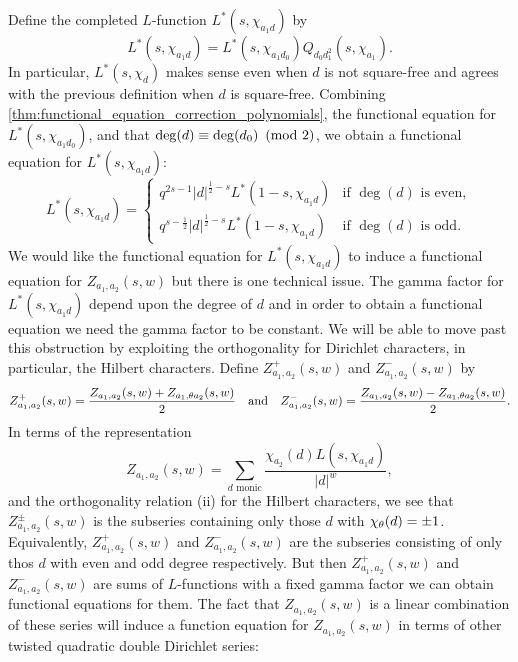 \documentclass[12pt,reqno,oneside]{amsart}
\begin{document}
    Define the completed $L$-function $L^{\ast}(s,\chi_{a_{1}d})$ by
    \[
        L^{\ast}(s,\chi_{a_{1}d}) = L^{\ast}(s,\chi_{a_{1}d_{0}})Q_{d_{0}d_{1}^{2}}(s,\chi_{a_{1}}).
    \]
    In particular, $L^{\ast}(s,\chi_{d})$ makes sense even when $d$ is not square-free and agrees with the previous definition when $d$ is square-free.
    Combining \cref{thm:functional_equation_correction_polynomials}, the functional equation for $L^{\ast}(s,\chi_{a_{1}d_{0}})$, and that $\deg(d) \equiv \deg(d_{0}) \ \left(\text{mod }2\right)$, we obtain a functional equation for $L^{\ast}(s,\chi_{a_{1}d})$:
    \[
        L^{\ast}(s,\chi_{a_{1}d}) = \begin{cases} q^{2s-1}|d|^{\frac{1}{2}-s}L^{\ast}(1-s,\chi_{a_{1}d}) & \text{if $\deg(d)$ is even}, \\ q^{s-\frac{1}{2}}|d|^{\frac{1}{2}-s}L^{\ast}(1-s,\chi_{a_{1}d}) & \text{if $\deg(d)$ is odd}. \end{cases}
    \]
    We would like the functional equation for $L^{\ast}(s,\chi_{a_{1}d})$ to induce a functional equation for $Z_{a_{1},a_{2}}(s,w)$ but there is one technical issue. The gamma factor for $L^{\ast}(s,\chi_{a_{1}d})$ depend upon the degree of $d$ and in order to obtain a functional equation we need the gamma factor to be constant. We will be able to move past this obstruction by exploiting the orthogonality for Dirichlet characters, in particular, the Hilbert characters. Define $Z_{a_{1},a_{2}}^{+}(s,w)$ and $Z_{a_{1},a_{2}}^{-}(s,w)$ by
    \[
        Z_{a_{1},a_{2}}^{+}(s,w) = \frac{Z_{a_{1},a_{2}}(s,w)+Z_{a_{1},\theta a_{2}}(s,w)}{2} \quad \text{and} \quad Z_{a_{1},a_{2}}^{-}(s,w) = \frac{Z_{a_{1},a_{2}}(s,w)-{Z_{a_{1},\theta a_{2}}(s,w)}}{2}.
    \]
    In terms of the representation
    \[
        Z_{a_{1},a_{2}}(s,w) = \sum_{\text{$d$ monic}}\frac{\chi_{a_{2}}(d)L(s,\chi_{a_{1}d})}{|d|^{w}},
    \]
    and the orthogonality relation (ii) for the Hilbert characters, we see that $Z_{a_{1},a_{2}}^{\pm}(s,w)$ is the subseries containing only those $d$ with $\chi_{\theta}(d) = \pm 1$. Equivalently, $Z_{a_{1},a_{2}}^{+}(s,w)$ and $Z_{a_{1},a_{2}}^{-}(s,w)$ are the subseries consisting of only thos $d$ with even and odd degree respectively. But then $Z_{a_{1},a_{2}}^{+}(s,w)$ and $Z_{a_{1},a_{2}}^{-}(s,w)$ are sums of $L$-functions with a fixed gamma factor we can obtain functional equations for them. The fact that $Z_{a_{1},a_{2}}(s,w)$ is a linear combination of these series will induce a function equation for $Z_{a_{1},a_{2}}(s,w)$ in terms of other twisted quadratic double Dirichlet series:
\end{document}
